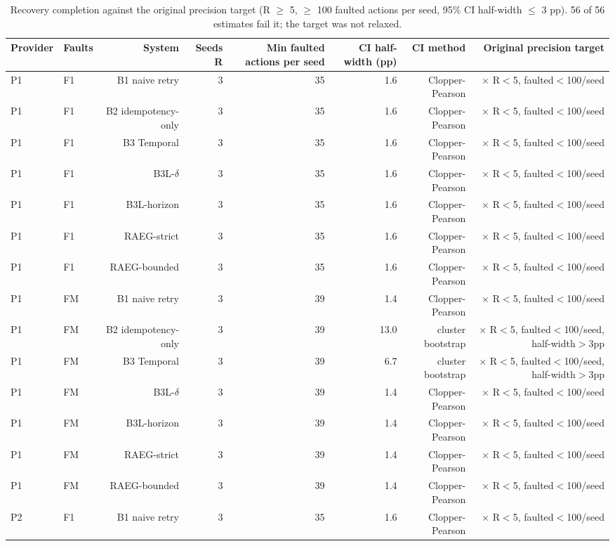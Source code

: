 \begin{table}[t]
\centering
\scriptsize
\caption{Recovery completion against the original precision target (R $\geq$ 5, $\geq$ 100 faulted actions per seed, 95\% CI half-width $\leq$ 3 pp). 56 of 56 estimates fail it; the target was not relaxed.}
\label{tab:m7-precision}
\begin{tabular}{llrrrrrr}
\toprule
Provider & Faults & System & Seeds R & Min faulted actions per seed & CI half-width (pp) & CI method & Original precision target \\
\midrule
P1 & F1 & B1 naive retry & 3 & 35 & 1.6 & Clopper-Pearson & $\times$ R$<$5, faulted$<$100/seed \\
P1 & F1 & B2 idempotency-only & 3 & 35 & 1.6 & Clopper-Pearson & $\times$ R$<$5, faulted$<$100/seed \\
P1 & F1 & B3 Temporal & 3 & 35 & 1.6 & Clopper-Pearson & $\times$ R$<$5, faulted$<$100/seed \\
P1 & F1 & B3L-$\delta$ & 3 & 35 & 1.6 & Clopper-Pearson & $\times$ R$<$5, faulted$<$100/seed \\
P1 & F1 & B3L-horizon & 3 & 35 & 1.6 & Clopper-Pearson & $\times$ R$<$5, faulted$<$100/seed \\
P1 & F1 & RAEG-strict & 3 & 35 & 1.6 & Clopper-Pearson & $\times$ R$<$5, faulted$<$100/seed \\
P1 & F1 & RAEG-bounded & 3 & 35 & 1.6 & Clopper-Pearson & $\times$ R$<$5, faulted$<$100/seed \\
P1 & FM & B1 naive retry & 3 & 39 & 1.4 & Clopper-Pearson & $\times$ R$<$5, faulted$<$100/seed \\
P1 & FM & B2 idempotency-only & 3 & 39 & 13.0 & cluster bootstrap & $\times$ R$<$5, faulted$<$100/seed, half-width$>$3pp \\
P1 & FM & B3 Temporal & 3 & 39 & 6.7 & cluster bootstrap & $\times$ R$<$5, faulted$<$100/seed, half-width$>$3pp \\
P1 & FM & B3L-$\delta$ & 3 & 39 & 1.4 & Clopper-Pearson & $\times$ R$<$5, faulted$<$100/seed \\
P1 & FM & B3L-horizon & 3 & 39 & 1.4 & Clopper-Pearson & $\times$ R$<$5, faulted$<$100/seed \\
P1 & FM & RAEG-strict & 3 & 39 & 1.4 & Clopper-Pearson & $\times$ R$<$5, faulted$<$100/seed \\
P1 & FM & RAEG-bounded & 3 & 39 & 1.4 & Clopper-Pearson & $\times$ R$<$5, faulted$<$100/seed \\
P2 & F1 & B1 naive retry & 3 & 35 & 1.6 & Clopper-Pearson & $\times$ R$<$5, faulted$<$100/seed \\

\end{tabular}
\end{table}
